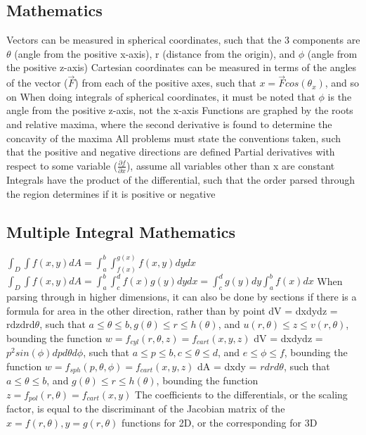 \documentclass[11 pt, twoside]{article}
\newenvironment{outline*}
{
	\begin{outline}[enumerate]
	}
	{\end{outline}
}
\begin{document}
\subsection{Mathematics}
\begin{outline*}
\1 Vectors can be measured in spherical coordinates, such that the 3 components are $\theta$ (angle from the positive x-axis), r (distance from the origin), and $\phi$ (angle from the positive z-axis)
\2 Cartesian coordinates can be measured in terms of the angles of the vector ($\vec{F}$) from each of the positive axes, such that $x = \vec{F}cos(\theta_x)$, and so on
\2 When doing integrals of spherical coordinates, it must be noted that $\phi$ is the angle from the positive z-axis, not the x-axis
\1 Functions are graphed by the roots and relative maxima, where the second derivative is found to determine the concavity of the maxima
\1 All problems must state the conventions taken, such that the positive and negative directions are defined
\1 Partial derivatives with respect to some variable ($\frac{\partial f}{\partial x}$), assume all variables other than x are constant
\1 Integrals have the product of the differential, such that the order parsed through the region determines if it is positive or negative
\end{outline*}
\subsection{Multiple Integral Mathematics}
\begin{outline*}
\1 $\int_D \int f(x, y)dA = \int^b_a \int^{g(x)}_{f(x)} f(x, y)dydx$
\1 $\int_D \int f(x, y)dA = \int^b_a \int^d_c f(x)g(y)dydx = \int^d_c g(y)dy \int^b_a f(x)dx$
\1 When parsing through in higher dimensions, it can also be done by sections if there is a formula for area in the other direction, rather than by point
\1 dV = dxdydz = rdzdrd$\theta$, such that $a \leq \theta \leq b, g(\theta) \leq r \leq h(\theta)$, and $u(r, \theta) \leq z \leq v(r, \theta)$, bounding the function $w  = f_{cyl}(r, \theta, z) = f_{cart}(x, y, z)$
\1 dV = dxdydz = $p^2sin(\phi)dpd\theta d\phi$, such that $a \leq p \leq b, c \leq \theta \leq d$, and $e \leq \phi \leq f$, bounding the function $w  = f_{sph}(p, \theta, \phi) = f_{cart}(x, y, z)$
\1 dA = dxdy = $rdrd\theta$, such that $a \leq \theta \leq b$, and $g(\theta) \leq r \leq h(\theta)$, bounding the function $z = f_{pol}(r, \theta) = f_{cart}(x, y)$
\1 The coefficients to the differentials, or the scaling factor, is equal to the discriminant of the Jacobian matrix of the $x = f(r, \theta), y = g(r, \theta)$ functions for 2D, or the corresponding for 3D
\end{outline*}
\end{document}
